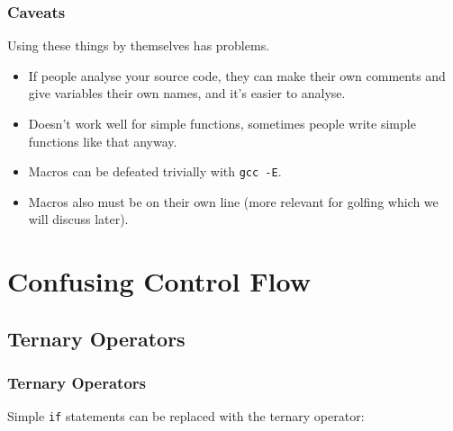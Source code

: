 \documentclass[xcolor]{beamer}
\begin{document}
\begin{frame}
	\frametitle{Caveats}
	\pause
	
	Using these things by themselves has problems.
	\pause
	
	\begin{itemize}
		\item If people analyse your source code, they can make their own comments and give variables their own names, and it's easier to analyse.
		\pause
		\item Doesn't work well for simple functions, sometimes people write simple functions like that anyway.
		\pause
		\item Macros can be defeated trivially with \texttt{gcc -E}.
		\pause
		\item Macros also must be on their own line (more relevant for golfing which we will discuss later).
	\end{itemize}
\end{frame}

\section{Confusing Control Flow}

\subsection{Ternary Operators}

\begin{frame}
	\frametitle{Ternary Operators}
	\pause
	
	Simple \texttt{if} statements can be replaced with the ternary operator:
	\pause
	
	\begin{columns}
		\begin{column}{0.45\textwidth}
			\centering
			
		\end{column}
		\pause
		\begin{column}{0.45\textwidth}
			\centering
			
		\end{column}
	\end{columns}
\end{frame}
\end{document}
